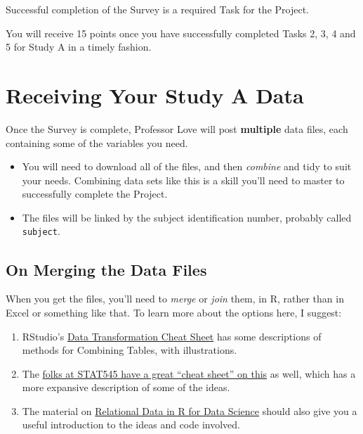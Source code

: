\documentclass[]{book}
\providecommand{\tightlist}{%
  \setlength{\itemsep}{0pt}\setlength{\parskip}{0pt}}
\begin{document}
Successful completion of the Survey is a required Task for the Project.

You will receive 15 points once you have successfully completed Tasks 2, 3, 4 and 5 for Study A in a timely fashion.

\hypertarget{receiving-your-study-a-data}{%
\section{Receiving Your Study A Data}\label{receiving-your-study-a-data}}

Once the Survey is complete, Professor Love will post \textbf{multiple} data files, each containing some of the variables you need.

\begin{itemize}
\tightlist
\item
  You will need to download all of the files, and then \emph{combine} and tidy to suit your needs. Combining data sets like this is a skill you'll need to master to successfully complete the Project.
\item
  The files will be linked by the subject identification number, probably called \texttt{subject}.
\end{itemize}

\hypertarget{on-merging-the-data-files}{%
\subsection{On Merging the Data Files}\label{on-merging-the-data-files}}

When you get the files, you'll need to \emph{merge} or \emph{join} them, in R, rather than in Excel or something like that. To learn more about the options here, I suggest:

\begin{enumerate}
\def\labelenumi{\arabic{enumi}.}
\tightlist
\item
  RStudio's \href{https://github.com/rstudio/cheatsheets/raw/master/data-transformation.pdf}{Data Transformation Cheat Sheet} has some descriptions of methods for Combining Tables, with illustrations.
\item
  The \href{https://stat545.com/join-cheatsheet.html}{folks at STAT545 have a great ``cheat sheet'' on this} as well, which has a more expansive description of some of the ideas.
\item
  The material on \href{https://r4ds.had.co.nz/relational-data.html}{Relational Data in R for Data Science} should also give you a useful introduction to the ideas and code involved.
\end{enumerate}
\end{document}

